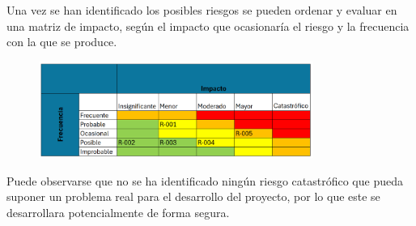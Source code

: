 Una vez se han identificado los posibles riesgos se pueden ordenar y evaluar en una matriz de impacto, según el impacto que ocasionaría el riesgo y la frecuencia con la que se produce.

\begin{figure}[H]
    \centering
    \includegraphics[width=0.80\textwidth]{tables/matrizImpacto.png}
    \label{table:matrizImpacto}
\end{figure}

Puede observarse que no se ha identificado ningún riesgo catastrófico que pueda suponer un problema real para el desarrollo del proyecto, por lo que este se desarrollara potencialmente de forma segura.